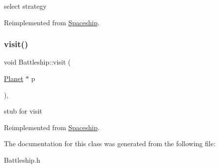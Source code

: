 select strategy 

Reimplemented from \hyperlink{classSpaceship_a93be2d9d2b675ef978d866d4cd7a6524}{Spaceship}.

\mbox{\label{classBattleship_af89b875b0dadcbf79b6d65d97398e7c1}} 
\subsubsection{\texorpdfstring{visit()}{visit()}}
{\footnotesize\ttfamily void Battleship\+::visit (\begin{DoxyParamCaption}\item[{\hyperlink{classPlanet}{Planet} $\ast$}]{p }\end{DoxyParamCaption})\hspace{0.3cm}{\ttfamily [inline]}, {\ttfamily [virtual]}}

stub for visit 

Reimplemented from \hyperlink{classSpaceship}{Spaceship}.



The documentation for this class was generated from the following file\+:\begin{DoxyCompactItemize}
\item 
Battleship.\+h\end{DoxyCompactItemize}

